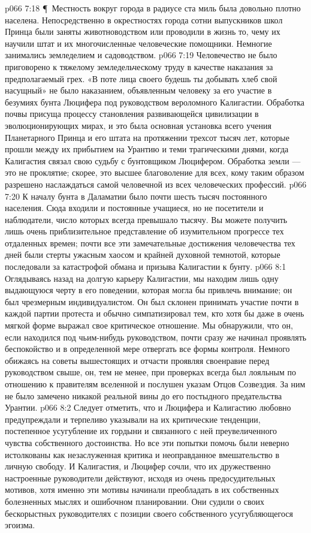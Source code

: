 \vs p066 7:18 \P\ Местность вокруг города в радиусе ста миль была довольно плотно населена. Непосредственно в окрестностях города сотни выпускников школ Принца были заняты животноводством или проводили в жизнь то, чему их научили штат и их многочисленные человеческие помощники. Немногие занимались земледелием и садоводством.
\vs p066 7:19 Человечество не было приговорено к тяжелому земледельческому труду в качестве наказания за предполагаемый грех. «В поте лица своего будешь ты добывать хлеб свой насущный» не было наказанием, объявленным человеку за его участие в безумиях бунта Люцифера под руководством вероломного Калигастии. Обработка почвы присуща процессу становления развивающейся цивилизации в эволюционирующих мирах, и это была основная установка всего учения Планетарного Принца и его штата на протяжении трехсот тысяч лет, которые прошли между их прибытием на Урантию и теми трагическими днями, когда Калигастия связал свою судьбу с бунтовщиком Люцифером. Обработка земли --- это не проклятие; скорее, это высшее благоволение для всех, кому таким образом разрешено наслаждаться самой человечной из всех человеческих профессий.
\vs p066 7:20 К началу бунта в Даламатии было почти шесть тысяч постоянного населения. Сюда входили и постоянные учащиеся, но не посетители и наблюдатели, число которых всегда превышало тысячу. Вы можете получить лишь очень приблизительное представление об изумительном прогрессе тех отдаленных времен; почти все эти замечательные достижения человечества тех дней были стерты ужасным хаосом и крайней духовной темнотой, которые последовали за катастрофой обмана и призыва Калигастии к бунту.
\vs p066 8:1 Оглядываясь назад на долгую карьеру Калигастии, мы находим лишь одну выдающуюся черту в его поведении, которая могла бы привлечь внимание; он был чрезмерным индивидуалистом. Он был склонен принимать участие почти в каждой партии протеста и обычно симпатизировал тем, кто хотя бы даже в очень мягкой форме выражал свое критическое отношение. Мы обнаружили, что он, если находился под чьим\hyp{}нибудь руководством, почти сразу же начинал проявлять беспокойство и в определенной мере отвергать все формы контроля. Немного обижаясь на советы вышестоящих и отчасти проявляя своенравие перед руководством свыше, он, тем не менее, при проверках всегда был лояльным по отношению к правителям вселенной и послушен указам Отцов Созвездия. За ним не было замечено никакой реальной вины до его постыдного предательства Урантии.
\vs p066 8:2 Следует отметить, что и Люцифера и Калигастию любовно предупреждали и терпеливо указывали на их критические тенденции, постепенное усугубление их гордыни и связанного с ней преувеличенного чувства собственного достоинства. Но все эти попытки помочь были неверно истолкованы как незаслуженная критика и неоправданное вмешательство в личную свободу. И Калигастия, и Люцифер сочли, что их дружественно настроенные руководители действуют, исходя из очень предосудительных мотивов, хотя именно эти мотивы начинали преобладать в их собственных болезненных мыслях и ошибочном планировании. Они судили о своих бескорыстных руководителях с позиции своего собственного усугубляющегося эгоизма.
